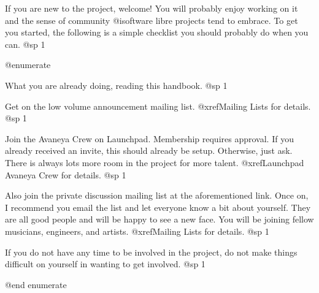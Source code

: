 
If you are new to the project, welcome! You will probably enjoy working on it and the sense of community @i{software libre} projects tend to embrace. To get you started, the following is a simple checklist you should probably do when you can.
@sp 1

@enumerate

\item
What you are already doing, reading this handbook.
@sp 1

\item
Get on the low volume announcement mailing list. @xref{Mailing Lists} for details.
@sp 1

\item
Join the Avaneya Crew on Launchpad. Membership requires approval. If you already received an invite, this should already be setup. Otherwise, just ask. There is always lots more room in the project for more talent. @xref{Launchpad Avaneya Crew} for details.
@sp 1

\item
Also join the private discussion mailing list at the aforementioned link. Once on, I recommend you email the list and let everyone know a bit about yourself. They are all good people and will be happy to see a new face. You will be joining fellow musicians, engineers, and artists. @xref{Mailing Lists} for details.
@sp 1

\item
If you do not have any time to be involved in the project, do not make things difficult on yourself in wanting to get involved.
@sp 1

@end enumerate

